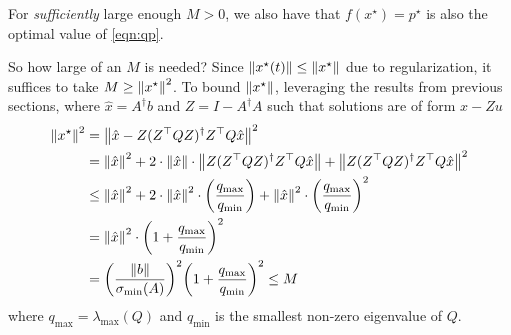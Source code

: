 \documentclass[12pt]{article}
\begin{document}
For \textit{sufficiently} large enough \(M > 0\), we also have
that \(f(x^\star) = p^\star\) is also the optimal value of
\eqref{eqn:qp}.

So how large of an \(M\) is needed?
Since \({\left\lVert x^\star (t)\right\rVert} \leq {\left\lVert x^\star\right\rVert}\) due to regularization,
it suffices to take \(M \geq {\left\lVert x^\star\right\rVert}^2\).
To bound \({\left\lVert x^\star\right\rVert}\),
leveraging the results from previous sections,
where \(\hat{x} = A^\dagger b\) and \(Z = I - A^\dagger A\)
such that solutions are of form \(\hat{x} - Z u\)
\begin{align*}
  {\left\lVert x^\star\right\rVert}^2
    &= {\left\lVert\hat{x}-Z(Z^\top Q Z)^\dagger Z^\top Q \hat{x}\right\rVert}^2 \\
    &= {\left\lVert\hat{x}\right\rVert}^2
        + 2 \cdot {\left\lVert\hat{x}\right\rVert}
          \cdot {\left\lVert Z(Z^\top Q Z)^\dagger Z^\top Q \hat{x}\right\rVert}
        + {\left\lVert Z(Z^\top Q Z)^\dagger Z^\top Q \hat{x}\right\rVert}^2 \\
    &\leq {\left\lVert\hat{x}\right\rVert}^2
        + 2 \cdot {\left\lVert\hat{x}\right\rVert}^2
            \cdot {\left(\frac{q_{\max}}{q_{\min}}\right)}
        + {\left\lVert\hat{x}\right\rVert}^2
          \cdot {\left(\frac{q_{\max}}{q_{\min}}\right)}^2 \\
    &= {\left\lVert\hat{x}\right\rVert}^2
        \cdot {\left(1 + \frac{q_{\max}}{q_{\min}}\right)}^2 \\
    &= {\left(\frac{{\left\lVert b\right\rVert}}{\sigma_{\min} (A)}\right)}^2
        {\left(1 + \frac{q_{\max}}{q_{\min}}\right)}^2
        \leq M
\end{align*}
where \(q_{\max} = \lambda_{\max} (Q)\)
and \(q_{\min}\) is the smallest non-zero eigenvalue of \(Q\).

\printbibliography
\end{document}
